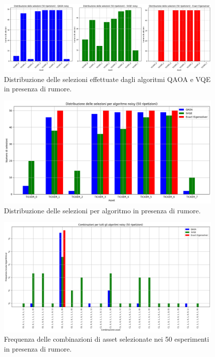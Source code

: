 \begin{figure}[ht!]
    \centering
    \includegraphics[width=0.99\textwidth]{images/risultati/noisy-risultati-1.png}
    \caption{Distribuzione delle selezioni effettuate dagli algoritmi QAOA e VQE in presenza di rumore.}
    \label{fig:noisy-risultati-1}
\end{figure}
\begin{figure}[ht!]
    \centering
    \includegraphics[width=0.99\textwidth]{images/risultati/noisy-risultati-2.png}
    \caption{Distribuzione delle selezioni per algoritmo in presenza di rumore.}
    \label{fig:noisy-risultati-2}
\end{figure}
\begin{figure}[ht!]
    \centering
    \includegraphics[width=0.99\textwidth]{images/risultati/noisy-risultati-3.png}
    \caption{Frequenza delle combinazioni di asset selezionate nei 50 esperimenti in presenza di rumore.}
    \label{fig:noisy-risultati-3}
\end{figure}



